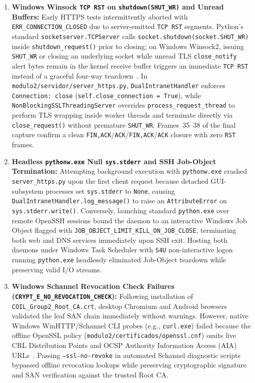 \begin{enumerate}
    \item \textbf{Windows Winsock \texttt{TCP RST} on \texttt{shutdown(SHUT\_WR)} and Unread Buffers:} Early HTTPS tests intermittently aborted with \texttt{ERR\_CONNECTION\_CLOSED} due to server-emitted \texttt{TCP RST} segments. Python's standard \texttt{socketserver.TCPServer} calls \texttt{socket.shutdown(socket.SHUT\_WR)} inside \texttt{shutdown\_request()} prior to closing; on Windows Winsock2, issuing \texttt{SHUT\_WR} or closing an underlying socket while unread TLS \texttt{close\_notify} alert bytes remain in the kernel receive buffer triggers an immediate \texttt{TCP RST} instead of a graceful four-way teardown~\cite{rfc9293,rfc8446}. In \nolinkurl{modulo2/servidor/server_https.py}, \texttt{DualIntranetHandler} enforces \texttt{Connection: close} (\texttt{self.close\_connection = True}), while \texttt{NonBlockingSSLThreadingServer} overrides \texttt{process\_request\_thread} to perform TLS wrapping inside worker threads and terminate directly via \texttt{close\_request()} without premature \texttt{SHUT\_WR}. Frames~35--38 of the final capture confirm a clean \texttt{FIN,ACK}/\texttt{ACK}/\texttt{FIN,ACK}/\texttt{ACK} closure with zero \texttt{RST} frames.

    \item \textbf{Headless \texttt{pythonw.exe} Null \texttt{sys.stderr} and SSH Job-Object Termination:} Attempting background execution with \texttt{pythonw.exe} crashed \texttt{server\_https.py} upon the first client request because detached GUI-subsystem processes set \texttt{sys.stderr} to \texttt{None}, causing \texttt{DualIntranetHandler.log\_message()} to raise an \texttt{AttributeError} on \texttt{sys.stderr.write()}. Conversely, launching standard \texttt{python.exe} over remote OpenSSH sessions bound the daemon to an interactive Windows Job Object flagged with \nolinkurl{JOB_OBJECT_LIMIT_KILL_ON_JOB_CLOSE}, terminating both web and DNS services immediately upon SSH exit. Hosting both daemons under Windows Task Scheduler with \texttt{S4U} non-interactive logon running \texttt{python.exe} headlessly eliminated Job-Object teardown while preserving valid I/O streams.

    \item \textbf{Windows Schannel Revocation Check Failures (\texttt{CRYPT\_E\_NO\_\allowbreak REVOCATION\_CHECK}):} Following installation of \nolinkurl{COIL_Group2_Root_CA.crt}, desktop Chromium and Android browsers validated the leaf SAN chain immediately without warnings. However, native Windows WinHTTP/Schannel CLI probes (e.g., \texttt{curl.exe}) failed because the offline OpenSSL policy (\nolinkurl{modulo2/certificados/openssl.cnf}) omits live CRL Distribution Points and OCSP Authority Information Access (AIA) URLs~\cite{rfc5280,openssl2024}. Passing \texttt{--ssl-no-revoke} in automated Schannel diagnostic scripts bypassed offline revocation lookups while preserving cryptographic signature and SAN verification against the trusted Root CA.
\end{enumerate}


